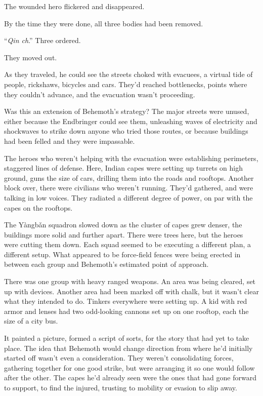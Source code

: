 The wounded hero flickered and disappeared.



By the time they were done, all three bodies had been removed.



``\emph{Qin ch}.''  Three ordered.



They moved out.



As they traveled, he could see the streets choked with evacuees, a virtual tide of people, rickshaws, bicycles and cars.  They'd reached bottlenecks, points where they couldn't advance, and the evacuation wasn't proceeding.



Was this an extension of Behemoth's strategy?  The major streets were unused, either because the Endbringer could see them, unleashing waves of electricity and shockwaves to strike down anyone who tried those routes, or because buildings had been felled and they were impassable.



The heroes who weren't helping with the evacuation were establishing perimeters, staggered lines of defense.  Here, Indian capes were setting up turrets on high ground, guns the size of cars, drilling them into the roads and rooftops.  Another block over, there were civilians who weren't running.  They'd gathered, and were talking in low voices.  They radiated a different degree of power, on par with the capes on the rooftops.



The Y\`{a}ngb\v{a}n squadron slowed down as the cluster of capes grew denser, the buildings more solid and further apart.  There were trees here, but the heroes were cutting them down.  Each squad seemed to be executing a different plan, a different setup.  What appeared to be force-field fences were being erected in between each group and Behemoth's estimated point of approach.



There was one group with heavy ranged weapons.  An area was being cleared, set up with devices.  Another area had been marked off with chalk, but it wasn't clear what they intended to do.  Tinkers everywhere were setting up.  A kid with red armor and lenses had two odd-looking cannons set up on one rooftop, each the size of a city bus.



It painted a picture, formed a script of sorts, for the story that had yet to take place.  The idea that Behemoth would change direction from where he'd initially started off wasn't even a consideration.  They weren't consolidating forces, gathering together for one good strike, but were arranging it so one would follow after the other.  The capes he'd already seen were the ones that had gone forward to support, to find the injured, trusting to mobility or evasion to slip away.



